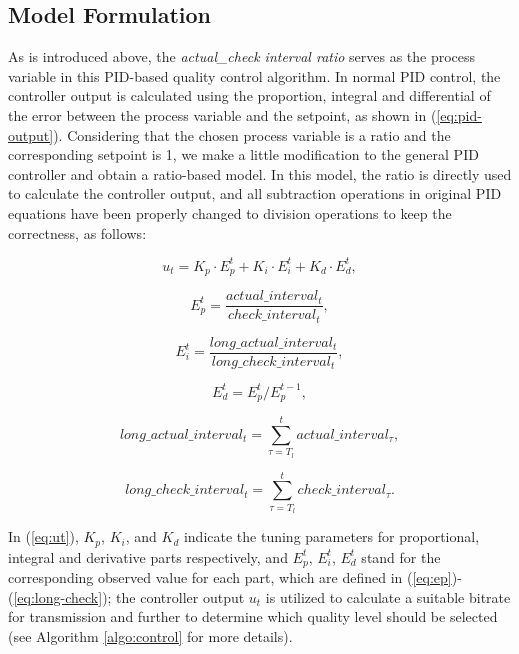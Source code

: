 \documentclass[journal]{IEEEtran}
\begin{document}
\subsection{Model Formulation}
\label{subsec:model-formulation}

As is introduced above, the \textit{actual\_check interval ratio} serves as the process variable in this PID-based quality control algorithm. In normal PID control, the controller output is calculated using the proportion, integral and differential of the error between the process variable and the setpoint, as shown in (\ref{eq:pid-output}). Considering that the chosen process variable is a ratio and the corresponding setpoint is 1, we make a little modification to the general PID controller and obtain a ratio-based model. In this model, the ratio is directly used to calculate the controller output, and all subtraction operations in original PID equations have been properly changed to division operations to keep the correctness, as follows:

\begin{equation}
\label{eq:ut}
{u_t} = {K_p} \cdot E_p^t + {K_i} \cdot E_i^t + {K_d} \cdot E_d^t ,
\end{equation}

\begin{equation}
\label{eq:ep}
E_p^t = \frac{{actual\_interva{l_t}}}{{check\_interva{l_t}}} ,
\end{equation}

\begin{equation}
\label{eq:ei}
E_i^t = \frac{{long\_actual\_interva{l_t}}}{{long\_check\_interva{l_t}}} ,
\end{equation}

\begin{equation}
\label{eq:ed}
E_d^t = E_p^t/E_p^{t - 1} ,
\end{equation}

\begin{equation}
\label{eq:long-actual}
long\_actual\_interva{l_t} = \sum\limits_{\tau = {T_l}}^t {actual\_interva{l_\tau}} ,
\end{equation}

\begin{equation}
\label{eq:long-check}
long\_check\_interva{l_t} = \sum\limits_{\tau = {T_l}}^t {check\_interva{l_\tau}} .
\end{equation}


In (\ref{eq:ut}), $K_p$, $K_i$, and $K_d$ indicate the tuning parameters for proportional, integral and derivative parts respectively, and $E_p^t$, $E_i^t$, $E_d^t$ stand for the corresponding observed value for each part, which are defined in (\ref{eq:ep})-(\ref{eq:long-check}); the controller output $u_t$ is utilized to calculate a suitable bitrate for transmission and further to determine which quality level should be selected (see Algorithm \ref{algo:control} for more details).
\end{document}
